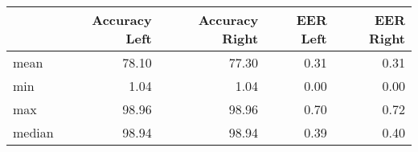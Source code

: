 \begin{tabular}{lrrrr}
\toprule
{} &  Accuracy Left &  Accuracy Right &  EER Left &  EER Right \\
\midrule
mean   &          78.10 &           77.30 &      0.31 &       0.31 \\
min    &           1.04 &            1.04 &      0.00 &       0.00 \\
max    &          98.96 &           98.96 &      0.70 &       0.72 \\
median &          98.94 &           98.94 &      0.39 &       0.40 \\
\bottomrule
\end{tabular}
